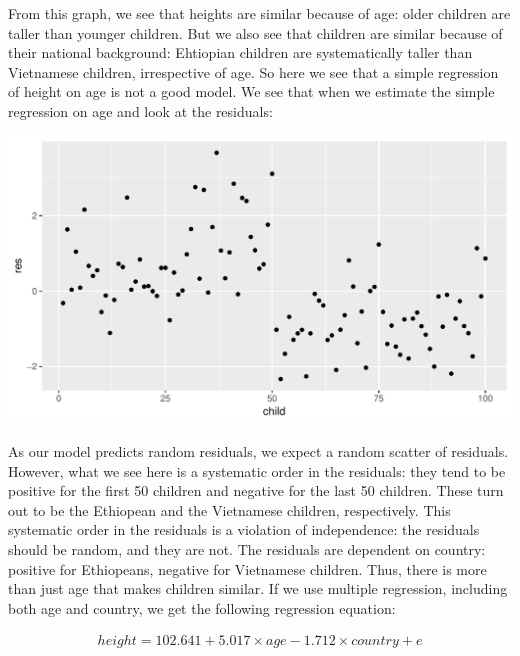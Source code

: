 \documentclass[]{report}\usepackage[]{graphicx}\usepackage[]{color}
\makeatletter
\def\maxwidth{ %
  \ifdim\Gin@nat@width>\linewidth
    \linewidth
  \else
    \Gin@nat@width
  \fi
}
\newenvironment{knitrout}{}{} %
\makeatother
\begin{document}
From this graph, we see that heights are similar because of age: older children are taller than younger children. But we also see that children are similar because of their national background: Ehtiopian children are systematically taller than Vietnamese children, irrespective of age. So here we see that a simple regression of height on age is not a good model. We see that when we estimate the simple regression on age and look at the residuals:

\begin{knitrout}
\color{fgcolor}

{\centering \includegraphics[width=\maxwidth]{figure/fig141-1} 

}



\end{knitrout}

As our model predicts random residuals, we expect a random scatter of residuals. However, what we see here is a systematic order in the residuals: they tend to be positive for the first 50 children and negative for the last 50 children. These turn out to be the Ethiopean and the Vietnamese children, respectively. This systematic order in the residuals is a violation of independence: the residuals should be random, and they are not. The residuals are dependent on country: positive for Ethiopeans, negative for Vietnamese children. Thus, there is more than just age that makes children similar. 
If we use multiple regression, including both age and country, we get the following regression equation:



\begin{eqnarray}
height = 102.641 + 5.017 \times age - 1.712 \times country + e
\end{eqnarray}
\end{document}
